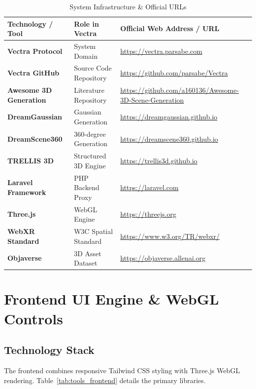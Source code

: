 \documentclass[11pt, a4paper]{article}
\begin{document}
\begin{table}[H]
\centering
\caption{System Infrastructure \& Official URLs}
\label{tab:tools_ch3}
\begin{tabularx}{\textwidth}{l l X}
\toprule
\textbf{Technology / Tool} & \textbf{Role in Vectra} & \textbf{Official Web Address / URL} \\
\midrule
\textbf{Vectra Protocol} & System Domain & \url{https://vectra.parsabe.com} \\
\textbf{Vectra GitHub} & Source Code Repository & \url{https://github.com/parsabe/Vectra} \\
\textbf{Awesome 3D Generation} & Literature Repository & \url{https://github.com/a160136/Awesome-3D-Scene-Generation} \\
\textbf{DreamGaussian} & Gaussian Generation & \url{https://dreamgaussian.github.io} \\
\textbf{DreamScene360} & 360-degree Generation & \url{https://dreamscene360.github.io} \\
\textbf{TRELLIS 3D} & Structured 3D Engine & \url{https://trellis3d.github.io} \\
\textbf{Laravel Framework} & PHP Backend Proxy & \url{https://laravel.com} \\
\textbf{Three.js} & WebGL Engine & \url{https://threejs.org} \\
\textbf{WebXR Standard} & W3C Spatial Standard & \url{https://www.w3.org/TR/webxr/} \\
\textbf{Objaverse} & 3D Asset Dataset & \url{https://objaverse.allenai.org} \\
\bottomrule
\end{tabularx}
\end{table}


\section{Frontend UI Engine \& WebGL Controls}

\subsection{Technology Stack}
The frontend combines responsive Tailwind CSS styling with Three.js WebGL rendering. Table~\ref{tab:tools_frontend} details the primary libraries.
\end{document}
